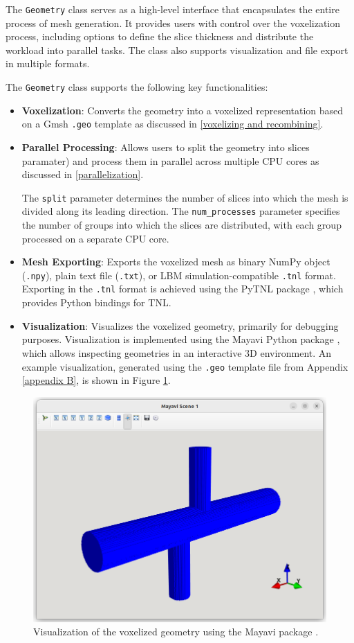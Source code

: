 The \texttt{Geometry} class serves as a high-level interface that encapsulates the entire process of mesh generation. It provides users with control over the voxelization process, including options to define the slice thickness and distribute the workload into parallel tasks. The class also supports visualization and file export in multiple formats.

The \texttt{Geometry} class supports the following key functionalities:
\begin{itemize}
	\item \textbf{Voxelization}: Converts the geometry into a voxelized representation based on a Gmsh \texttt{.geo} template as discussed in \ref{voxelizing and recombining}. 
	
	\item \textbf{Parallel Processing}: Allows users to split the geometry into slices paramater) and process them in parallel across multiple CPU cores as discussed in \ref{parallelization}.
	
	The \texttt{split} parameter determines the number of slices into which the mesh is divided along its leading direction. The \texttt{num\_processes} parameter specifies the number of groups into which the slices are distributed, with each group processed on a separate CPU core. 
	
	\item \textbf{Mesh Exporting}: Exports the voxelized mesh as binary NumPy object (\texttt{.npy}), plain text file (\texttt{.txt}), or LBM simulation-compatible \texttt{.tnl} format. Exporting in the \texttt{.tnl} format is achieved using the PyTNL package \cite{pytnl}, which provides Python bindings for TNL.
	
	\item \textbf{Visualization}: Visualizes the voxelized geometry, primarily for debugging purposes. Visualization is implemented using the Mayavi Python package \cite{mayavi}, which allows inspecting geometries in an interactive 3D environment. An example visualization, generated using the \texttt{.geo} template file from Appendix \ref{appendix B}, is shown in Figure \ref{fig:visualization}.
\end{itemize}

\begin{figure}[H]
	\centering
	\includegraphics[width=.7\textwidth]{figures/mayavi.png}
	\caption{Visualization of the voxelized geometry using the Mayavi package \cite{mayavi}.}
	\label{fig:visualization}
\end{figure}


